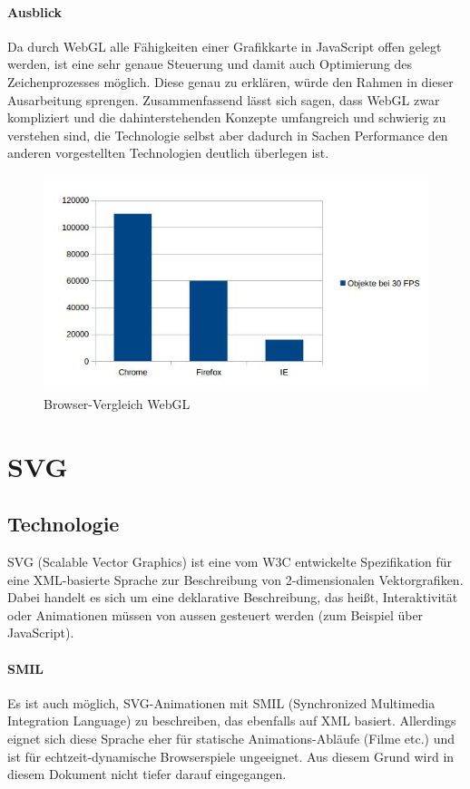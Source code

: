 \documentclass[a4paper, 12pt]{article}
\begin{document}
\paragraph{Ausblick} Da durch WebGL alle Fähigkeiten einer Grafikkarte in JavaScript offen gelegt werden, ist eine sehr genaue Steuerung und damit auch Optimierung des Zeichenprozesses möglich. Diese genau zu erklären, würde den Rahmen in dieser Ausarbeitung sprengen. Zusammenfassend lässt sich sagen, dass WebGL zwar kompliziert und die dahinterstehenden Konzepte umfangreich und schwierig zu verstehen sind, die Technologie selbst aber dadurch in Sachen Performance den anderen vorgestellten Technologien deutlich überlegen ist. 
\begin{figure}[H]
	\includegraphics[width=\textwidth]{assets/browser_comp_webgl} 
	\caption{Browser-Vergleich WebGL}
	\label{browser_comp_webgl}
\end{figure}
\newpage
\section{SVG}
\subsection{Technologie}
SVG (Scalable Vector Graphics) ist eine vom W3C entwickelte Spezifikation für eine XML-basierte Sprache zur Beschreibung von 2-dimensionalen Vektorgrafiken. Dabei handelt es sich um eine deklarative Beschreibung, das heißt, Interaktivität oder Animationen müssen von aussen gesteuert werden (zum Beispiel über JavaScript).
\paragraph{SMIL} Es ist auch möglich, SVG-Animationen mit SMIL (Synchronized Multimedia Integration Language) zu beschreiben, das ebenfalls auf XML basiert. Allerdings eignet sich diese Sprache eher für statische Animations-Abläufe (Filme etc.) und ist für echtzeit-dynamische Browserspiele ungeeignet. Aus diesem Grund wird in diesem Dokument nicht tiefer darauf eingegangen.
\end{document}
